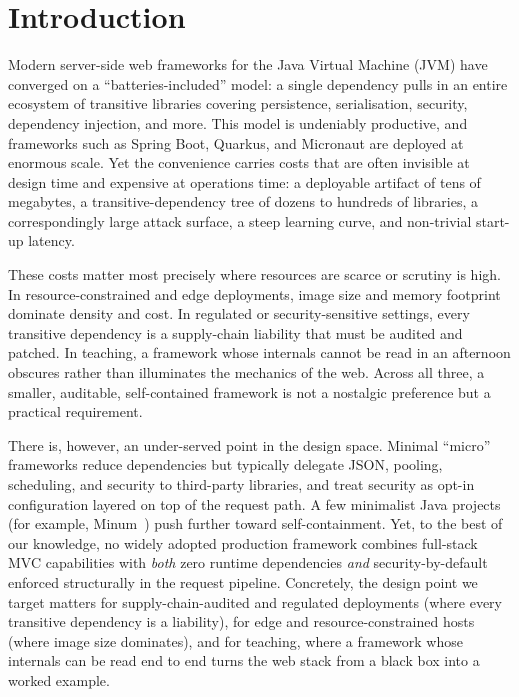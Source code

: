 \section{Introduction}\label{sec:intro}

Modern server-side web frameworks for the Java Virtual Machine (JVM)
have converged on a ``batteries-included'' model: a single dependency
pulls in an entire ecosystem of transitive libraries covering
persistence, serialisation, security, dependency injection, and more.
This model is undeniably productive, and frameworks such as Spring
Boot, Quarkus, and Micronaut are deployed at enormous scale. Yet the
convenience carries costs that are often invisible at design time and
expensive at operations time: a deployable artifact of tens of
megabytes, a transitive-dependency tree of dozens to hundreds of
libraries, a correspondingly large attack surface, a steep learning
curve, and non-trivial start-up latency.

These costs matter most precisely where resources are scarce or
scrutiny is high. In resource-constrained and edge deployments, image
size and memory footprint dominate density and cost. In regulated or
security-sensitive settings, every transitive dependency is a supply-chain
liability that must be audited and patched. In teaching, a framework
whose internals cannot be read in an afternoon obscures rather than
illuminates the mechanics of the web. Across all three, a smaller,
auditable, self-contained framework is not a nostalgic preference but a
practical requirement.

There is, however, an under-served point in the design space. Minimal
``micro'' frameworks reduce dependencies but typically delegate JSON,
pooling, scheduling, and security to third-party libraries, and treat
security as opt-in configuration layered on top of the request path. A
few minimalist Java projects (for example, Minum~\cite{minum}) push further toward
self-containment. Yet, to the best of our knowledge, no widely adopted
production framework combines full-stack MVC capabilities with
\emph{both} zero runtime dependencies \emph{and} security-by-default
enforced structurally in the request pipeline. Concretely, the design
point we target matters for supply-chain-audited and regulated
deployments (where every transitive dependency is a liability), for
edge and resource-constrained hosts (where image size dominates), and
for teaching, where a framework whose internals can be read end to end
turns the web stack from a black box into a worked example.

